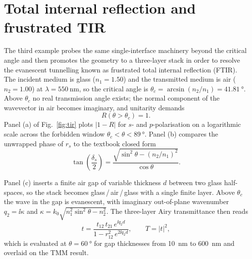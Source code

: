 \section{Total internal reflection and frustrated TIR}

The third example probes the same single-interface machinery beyond the
critical angle and then promotes the geometry to a three-layer stack in
order to resolve the evanescent tunnelling known as frustrated total
internal reflection (FTIR). The incident medium is glass ($n_1 = 1.50$)
and the transmitted medium is air ($n_2 = 1.00$) at
$\lambda = \SI{550}{\nano\metre}$, so the critical angle is
$\theta_c = \arcsin(n_2/n_1) = \SI{41.81}{\degree}$. Above $\theta_c$ no
real transmission angle exists; the normal component of the wavevector in
air becomes imaginary, and unitarity demands
\begin{equation}
  R(\theta > \theta_c) = 1. \label{eq:tir-R}
\end{equation}
Panel (a) of Fig.~\ref{fig:tir} plots $|1 - R|$ for $s$- and
$p$-polarisation on a logarithmic scale across the forbidden window
$\theta_c < \theta < \SI{89}{\degree}$. Panel (b) compares the unwrapped
phase of $r_s$ to the textbook closed form
\begin{equation}
  \tan\!\left(\frac{\delta_s}{2}\right) = \frac{\sqrt{\sin^{2}\theta - (n_2/n_1)^{2}}}{\cos\theta}. \label{eq:tir-phase}
\end{equation}

Panel (c) inserts a finite air gap of variable thickness $d$ between two
glass half-spaces, so the stack becomes glass\,/\,air\,/\,glass with a
single finite layer. Above $\theta_c$ the wave in the gap is evanescent,
with imaginary out-of-plane wavenumber $q_2 = \ii\kappa$ and
$\kappa = k_0\sqrt{n_1^{2}\sin^{2}\theta - n_2^{2}}$. The three-layer
Airy transmittance then reads
\begin{equation}
  t = \frac{t_{12}\,t_{21}\,e^{\ii q_2 d}}{1 - r_{12}^{2}\,e^{2\ii q_2 d}},\qquad T = |t|^{2}, \label{eq:ftir-T}
\end{equation}
which is evaluated at $\theta = \SI{60}{\degree}$ for gap thicknesses from
\SI{10}{\nano\metre} to \SI{600}{\nano\metre} and overlaid on the TMM
result.

\begin{center}
\end{center}

